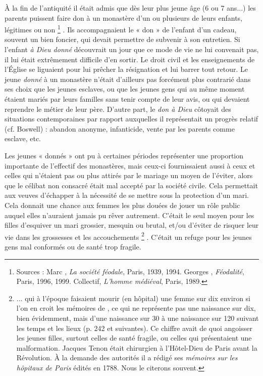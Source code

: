  À la fin de l'antiquité il était admis que dès leur plus jeune âge (6 ou 7 ans...) les parents puissent faire don à un monastère d'un ou plusieurs de leurs enfants, légitimes ou non%
\footnote{Sources : Marc , \emph{La société féodale}, Paris, 1939, 1994. Georges , \emph{Féodalité}, Paris, 1996, 1999. Collectif, \emph{L'homme médiéval}, Paris, 1989.}%
. Ils accompagnaient le « don » de l'enfant d'un cadeau, souvent un bien foncier, qui devait permettre de subvenir à son entretien. Si l'enfant \emph{à Dieu donné} découvrait un jour que ce mode de vie ne lui convenait pas, il lui était extrêmement difficile d'en sortir. Le droit civil et les enseignements de l'Église se liguaient pour lui prêcher la résignation et lui barrer tout retour. Le jeune \emph{donné} à un monastère n'était d'ailleurs pas forcément plus contrarié dans ses choix que les jeunes esclaves, ou que les jeunes gens qui au même moment étaient mariés par leurs familles sans tenir compte de leur avis, ou qui devaient reprendre le métier de leur père. D'autre part, le \emph{don à Dieu} côtoyait des situations contemporaines par rapport auxquelles il représentait un progrès relatif (cf. {Boswell}) : abandon anonyme, infanticide, vente par les parents comme esclave, etc. 


Les jeunes « donnés » ont pu à certaines périodes représenter une proportion importante de l'effectif des monastères, mais ceux-ci fournissaient aussi à ceux et celles qui n'étaient pas ou plus attirés par le mariage un moyen de l'éviter, alors que le célibat non consacré était mal accepté par la société civile. Cela permettait aux veuves d'échapper à la nécessité de se mettre sous la protection d'un mari. Cela donnait une chance aux femmes les plus douées de jouer un rôle public auquel elles n'auraient jamais pu rêver autrement. C'était le seul moyen pour les filles d'esquiver un mari grossier, mesquin ou brutal, et/ou d'éviter de risquer leur vie dans les grossesses et les accouchements%
\footnote{... qui à l'époque faisaient mourir (en hôpital) une femme sur dix environ si l'on en croit les mémoires de , ce qui ne représente pas une naissance sur dix, bien évidemment, mais d'une naissance sur 30 à une naissance sur 120 suivant les temps et les lieux (p. 242 et suivantes). Ce chiffre avait de quoi angoisser les jeunes filles, surtout celles de santé fragile, ou celles qui présentaient une malformation. Jacques Tenon était chirurgien à l'Hôtel-Dieu de Paris avant la Révolution. À la demande des autorités il a rédigé ses \emph{mémoires sur les hôpitaux de Paris} édités en 1788. Nous le citerons souvent.}%
. C'était un refuge pour les jeunes gens mal conformés ou de santé trop fragile. 


